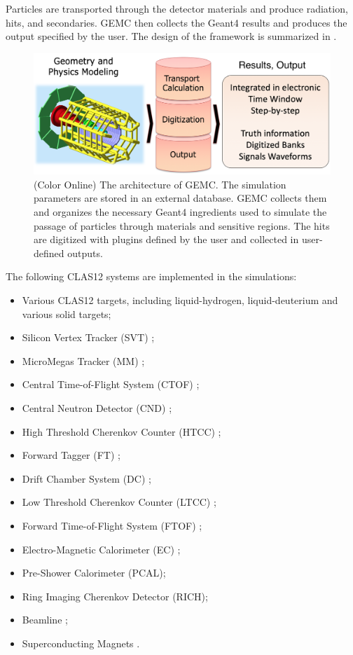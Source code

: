 Particles are transported through the detector materials and produce radiation, hits, and secondaries.
GEMC then collects the Geant4 results and produces the output specified by the user.
The design of the framework is summarized in .

\begin{figure}
	\centering
	\includegraphics[width=1.0\columnwidth,keepaspectratio]{img/gemcDesign.png}
	\caption{(Color Online) The architecture of GEMC. The simulation parameters are stored in an external database. GEMC collects
             them and organizes the necessary Geant4 ingredients used to simulate the
             passage of particles through materials and sensitive regions. The hits are digitized with
             plugins defined by the user and collected in user-defined outputs.  }
	\label{fig:gemcDesign}
\end{figure}

The following CLAS12 systems are implemented in the simulations:

\begin{itemize}
\item Various CLAS12 targets, including liquid-hydrogen, liquid-deuterium and various solid targets;
\item Silicon Vertex Tracker (SVT) \cite{svt-nim};
\item MicroMegas Tracker (MM) \cite{mm-nim};
\item Central Time-of-Flight System (CTOF) \cite{ctof-nim};
\item Central Neutron Detector (CND) \cite{cnd-nim};
\item High Threshold Cherenkov Counter (HTCC) \cite{htcc-nim};
\item Forward Tagger (FT) \cite{ft-nim};
\item Drift Chamber System (DC) \cite{dc-nim};
\item Low Threshold Cherenkov Counter (LTCC) \cite{ltcc-nim};
\item Forward Time-of-Flight System (FTOF) \cite{ftof-nim};
\item Electro-Magnetic Calorimeter (EC) \cite{Amarian:2001zs};
\item Pre-Shower Calorimeter (PCAL)\cite{ec-nim};
\item Ring Imaging Cherenkov Detector (RICH)\cite{rich-nim};
\item Beamline \cite{beamline-nim};
\item Superconducting Magnets \cite{magnets-nim}.
\end{itemize}

